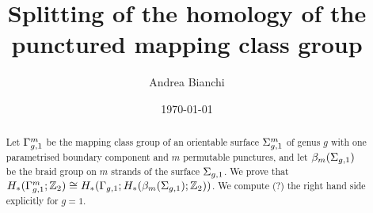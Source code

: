 \documentclass{amsart}
\theoremstyle{plain}
\theoremstyle{definition}
\begin{document}
\title{Splitting of the homology of the punctured mapping class group}

\author{Andrea Bianchi}

\address{Mathematics Institute,
University of Bonn,
Endenicher Allee 60, Bonn,
Germany
}




\date{\today}



\begin{abstract}
Let $\Gamma_{g,1}^m$ be the mapping class group of an orientable surface $\Sigma_{g,1}^m$ of genus $g$ with one parametrised
boundary component and $m$ permutable punctures, and let $\beta_{m}(\Sigma_{g,1})$ be the braid group on $m$ strands
of the surface $\Sigma_{g,1}$. We prove that $H_*(\Gamma_{g,1}^m;\mathbb{Z}_2)\cong H_*(\Gamma_{g,1};H_*(\beta_{m}(\Sigma_{g,1});\mathbb{Z}_2))$.
We compute (?) the right hand side explicitly for $g=1$.
\end{abstract}


\maketitle

















{}

\end{document}
